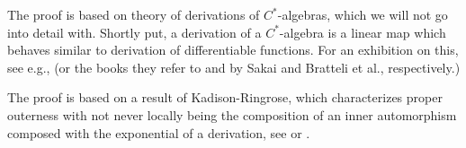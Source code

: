 \begin{remark}
	The proof is based on theory of derivations of $C^*$-algebras, which we will not go into detail with. Shortly put, a derivation of a $C^*$-algebra is a linear map which behaves similar to derivation of differentiable functions. For an exhibition on this, see e.g., \cite[Chapter 8.6]{pedersenalgauto} (or the books they refer to \cite{sakai1978recent} and \cite{bratteli2012operator} by Sakai and Bratteli et al., respectively.) 

	The proof is based on a result of Kadison-Ringrose, which characterizes proper outerness with not never locally being the composition of an inner automorphism composed with the exponential of a derivation, see \cite{kadison1967derivations} or \cite[Theorem 6.6 (i) and (ii)]{olesenpedersen3}.
\end{remark}

